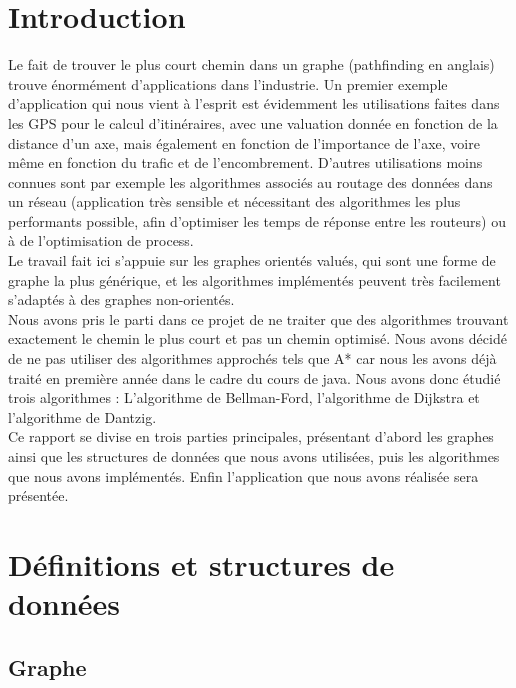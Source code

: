 \documentclass[a4paper,12pt,final] {article}
\begin{document}
\newpage

\setcounter{page}{2} 
\tableofcontents

\newpage

\section{Introduction}

Le fait de trouver le plus court chemin dans un graphe (pathfinding en anglais) trouve énormément d'applications dans l'industrie. Un premier exemple d'application qui nous vient à l'esprit est évidemment les utilisations faites dans les GPS pour le calcul d'itinéraires, avec une valuation donnée en fonction de la distance d'un axe, mais également en fonction de l'importance de l'axe, voire même en fonction du trafic et de l'encombrement. D'autres utilisations moins connues sont par exemple les algorithmes associés au routage des données dans un réseau (application très sensible et nécessitant des algorithmes les plus performants possible, afin d'optimiser les temps de réponse entre les routeurs) ou à de l'optimisation de process.\\

Le travail fait ici s'appuie sur les graphes orientés valués, qui sont une forme de graphe la plus générique, et les algorithmes implémentés peuvent très facilement s'adaptés à des graphes non-orientés.\\

Nous avons pris le parti dans ce projet de ne traiter que des algorithmes trouvant exactement le chemin le plus court et pas un chemin optimisé. Nous avons décidé de ne pas utiliser des algorithmes approchés tels que A* car nous les avons déjà traité en première année dans le cadre du cours de java. Nous avons donc étudié trois algorithmes : L'algorithme de Bellman-Ford, l'algorithme de Dijkstra et l'algorithme de Dantzig.\\

Ce rapport se divise en trois parties principales, présentant d'abord les graphes ainsi que les structures de données que nous avons utilisées, puis les algorithmes que nous avons implémentés. Enfin l'application que nous avons réalisée sera présentée.

\newpage
\section{Définitions et structures de données}
\subsection{Graphe}
\end{document}
